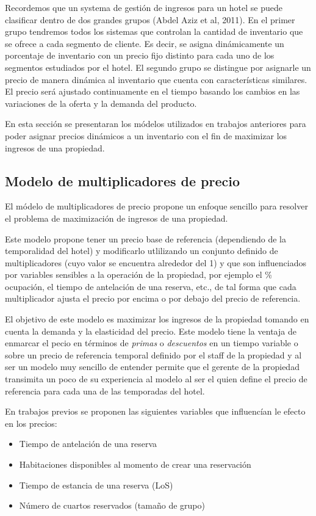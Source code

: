 {Recordemos que un systema de gestión de ingresos para un hotel se puede clasificar dentro de dos grandes grupos (Abdel Aziz et al, 2011). En el primer grupo tendremos todos los sistemas que controlan la cantidad de inventario que se ofrece a cada segmento de cliente. Es decir, se asigna dinámicamente un porcentaje de inventario con un precio fijo distinto para cada uno de los segmentos estudiados por el hotel. El segundo grupo se distingue por asignarle un precio de manera dinámica al inventario que cuenta con características similares. El precio será ajustado continuamente en el tiempo basando los cambios en las variaciones de la oferta y la demanda del producto.

En esta sección se presentaran los módelos utilizados en trabajos anteriores para poder asignar precios dinámicos a un inventario con el fin de maximizar los ingresos de una propiedad.

\subsection*{Modelo de multiplicadores de precio}

El módelo de multiplicadores de precio propone un enfoque sencillo para resolver el problema de maximización de ingresos de una propiedad.

Este modelo propone tener un precio base de referencia (dependiendo de la temporalidad del hotel) y modificarlo utlilizando un conjunto definido de multiplicadores (cuyo valor se encuentra alrededor del 1) y que son influenciados por variables sensibles a la operación de la propiedad, por ejemplo el \% ocupación, el tiempo de antelación de una reserva, etc., de tal forma que cada multiplicador ajusta el precio por encima o por debajo del precio de referencia. 

El objetivo de este modelo es maximizar los ingresos de la propiedad tomando en cuenta la demanda y la elasticidad del precio. Este modelo tiene la ventaja de enmarcar el pecio en términos de \emph{primas} o \emph{descuentos} en un tiempo variable o sobre un precio de referencia temporal definido por el staff de la propiedad y al ser un modelo muy sencillo de entender permite que el gerente de la propiedad transimita un poco de su experiencia al modelo al ser el quien define el precio de referencia para cada una de las temporadas del hotel.

En trabajos previos se proponen las siguientes variables que influencían le efecto en los precios:
\begin{itemize}
  \item Tiempo de antelación de una reserva
  \item Habitaciones disponibles al momento de crear una reservación
  \item Tiempo de estancia de una reserva (LoS)
  \item Número de cuartos reservados (tamaño de grupo)
\end{itemize}

}
